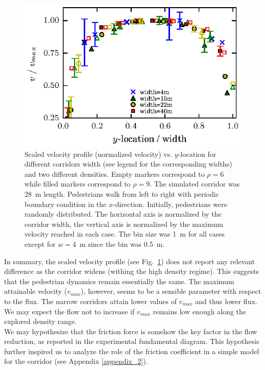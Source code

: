 \begin{figure}[htbp!]
\includegraphics[width=\columnwidth]
{plots/v(y)_multi_width_normaliz.eps}
\caption{\label{speed-profile-width-normaliz} Scaled velocity profile (normalized velocity) vs. $y$-location for different corridors width (see legend for the corresponding widths) and two different densities. Empty markers correspond to $\rho=6$ while filled markers correspond to  $\rho=9$. The simulated corridor was 28~m length. Pedestrians walk from left to right with periodic boundary condition in the $x$-direction. Initially, pedestrians were randomly distributed. The horizontal axis is normalized by the corridor width, the vertical axis is normalized by the maximum velocity reached in each case.  The bin size was 1~m for all cases except for $w=4$~m since the bin was 0.5~m.}
\end{figure}

{\color{red} In summary, the scaled velocity profile (see Fig.~\ref{speed-profile-width-normaliz}) does not report any relevant difference as the corridor widens (withing the high density regime). This suggests that the pedestrian dynamics remain essentially the same. The maximum attainable velocity ($v_{max}$), however, seems to be a sensible parameter with respect to the flux.  The narrow corridors attain lower values of $v_{max}$ and thus lower flux. We may expect the flow not to increase if $v_{max}$ remains low enough along the explored density range.\\


We may hypothesize that the friction force is somehow the key factor in the
flow reduction, as reported in the experimental fundamental diagram. This hypothesis further inspired us to analyze the role of the friction coefficient in a simple model for the corridor (see Appendix \ref{appendix_2}). }

